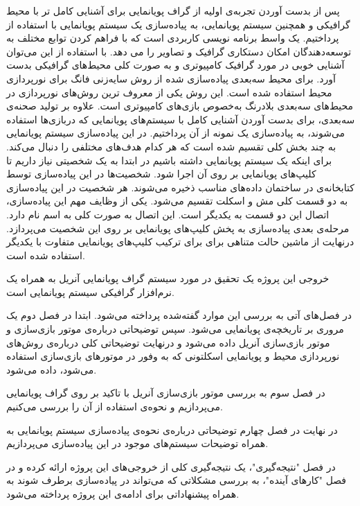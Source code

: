 پس از بدست آوردن تجربه‌ی اولیه از گراف پویانمایی برای آشنایی کامل تر 
با محیط گرافیکی و همچنین سیستم پویانمایی، به پیاده‌سازی یک سیستم پویانمایی با استفاده از 
پرداختیم.
یک واسط برنامه نویسی کاربردی
است که با فراهم کردن توابع مختلف به توسعه‌دهندگان امکان دستکاری گرافیک و تصاویر را می ‌دهد.
با استفاده از این 
می‌توان آشنایی خوبی در مورد گرافیک کامپیوتری و به صورت کلی محیط‌های گرافیکی بدست آورد.
برای محیط سه‌بعدی پیاده‌سازی شده از روش سایه‌زنی فانگ 
برای نورپردازی محیط استفاده شده است. این روش یکی از معروف ترین روش‌های نورپردازی در محیط‌های سه‌بعدی بلادرنگ به‌خصوص بازی‌های کامپیوتری است. علاوه بر تولید صحنه‌ی سه‌بعدی،
برای بدست آوردن آشنایی کامل با سیستم‌های پویانمایی که دربازی‌ها استفاده می‌شوند، به پیاده‌سازی یک نمونه از آن پرداختیم.
در این پیاده‌سازی سیستم پویانمایی به چند بخش کلی تقسیم شده است که هر کدام هدف‌های مختلفی را دنبال می‌کند.
برای اینکه یک سیستم پویانمایی داشته باشیم در ابتدا به یک شخصیتی نیاز داریم 
تا کلیپ‌های پویانمایی بر روی آن اجرا شود.
شخصیت‌ها در این پیاده‌سازی توسط کتابخانه‌ی 
در ساختمان داده‌های مناسب ذخیره می‌شوند.
هر شخصیت در این پیاده‌سازی به دو قسمت کلی مش و اسکلت تقسیم می‌شود.
یکی از وظایف مهم این پیاده‌سازی، اتصال این دو قسمت به یکدیگر 
است.
این اتصال به صورت کلی به اسم 
نام دارد. 
مرحله‌ی بعدی پیاده‌سازی به پخش کلیپ‌های پویانمایی بر روی این شخصیت می‌پردازد.
درنهایت از ماشین حالت متناهی برای برای ترکیب کلیپ‌های پویانمایی متفاوت با یکدیگر استفاده شده است.

خروجی این پروژه یک تحقیق در مورد سیستم گراف پویانمایی آنریل به همراه 
یک نرم‌افزار گرافیکی سیستم پویانمایی است.

در فصل‌های آتی به بررسی این موارد گفته‌شده پرداخته می‌شود.
ابتدا در فصل دوم یک مروری بر تاریخچه‌ی پویانمایی می‌شود. سپس توضیحاتی درباره‌ی موتور بازی‌سازی و 
موتور بازی‌سازی آنریل داده می‌شود و درنهایت توضیحاتی کلی 
درباره‌ی روش‌های نورپردازی محیط و پویانمایی اسکلتونی که به وفور در موتور‌های بازی‌سازی استفاده می‌شود، داده می‌شود.

در فصل سوم به بررسی موتور بازی‌سازی آنریل با تاکید بر روی گراف پویانمایی می‌پردازیم و نحوه‌ی استفاده از آن را بررسی می‌کنیم.

در نهایت در فصل چهارم توضیحاتی درباره‌ی نحوه‌ی پیاده‌سازی سیستم پویانمایی
به همراه توضیحات سیستم‌های موجود در این پیاده‌سازی می‌پردازیم.

در فصل "نتیجه‌گیری"، یک نتیجه‌گیری کلی از خروجی‌های این پروژه ارائه کرده 
و در فصل "کارهای آینده"، به بررسی مشکلاتی که می‌تواند در پیاده‌سازی برطرف شوند به همراه 
پیشنهاداتی برای ادامه‌ی این پروژه پرداخته می‌شود.

